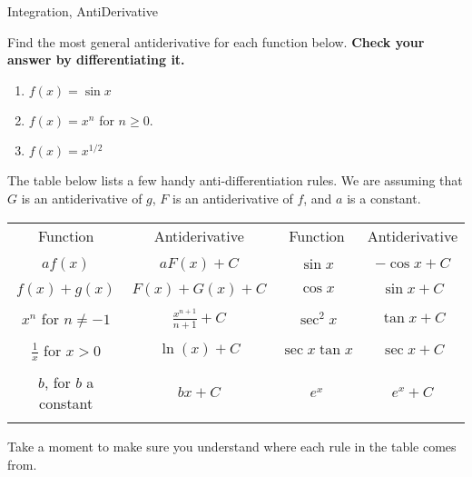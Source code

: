 \begin{tagblock}{Integration, AntiDerivative}
\begin{question}

	Find the most general antiderivative for each function below. \textbf{Check your answer by differentiating it.}
\begin{enumerate}
\item $\displaystyle{f(x) = \sin x}$
\vspace{1in}
\item $\displaystyle{f(x) = x^n}$ for $n\geq 0$.
\vspace{1in}
\item $\displaystyle{f(x) = x^{1/2}}$
\vspace{1in}
\end{enumerate}

The table below lists a few handy anti-differentiation rules. We are assuming that $G$ is an antiderivative of $g$, $F$ is an antiderivative of $f$, and $a$ is a constant.\\
\begin{table}[h]

\begin{center}
\begin{tabular}{|c|c||c|c|}\hline
Function & Antiderivative & Function & Antiderivative \\ 
& & & \\ \hline
$af(x)$ & $aF(x) + C$ & $\sin x$ & $-\cos x+C$ \\
& & & \\
$f(x) + g(x)$ & $F(x)+G(x)+C$ & $\cos x$ & $\sin x+C$ \\
& & & \\
$x^n$ for $n\neq -1$ & $\frac{x^{n+1}}{n+1} + C$ & $\sec^2 x$ & $\tan x +C$ \\ 
& & & \\
$\frac{1}{x}$ for $x>0$ & $\ln(x)+ C$ & $ \sec x \tan x$ & $\sec x +C$ \\
 & & & \\  
 $b$, for $b$ a constant & $bx+C$ &  $e^x$ & $e^x+C$  \\
 &&& \\ \hline



\end{tabular}
\end{center}
\label{default}
\end{table}%

Take a moment to make sure you understand where each rule in the table comes from.
	

\end{question}
\end{tagblock}
